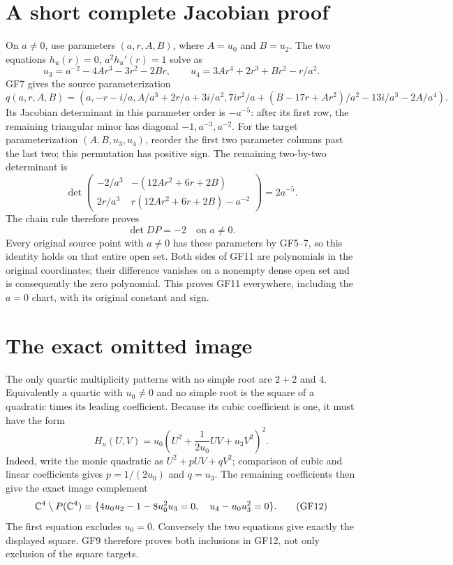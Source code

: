 \section{A short complete Jacobian proof}
On $a\ne0$, use parameters $(a,r,A,B)$, where $A=u_0$ and $B=u_2$.
The two equations $h_u(r)=0$, $a^2h_u'(r)=1$ solve as
\begin{equation}
 u_3=a^{-2}-4Ar^3-3r^2-2Br,
 \qquad u_4=3Ar^4+2r^3+Br^2-r/a^2.\tag{GF10}
\end{equation}
GF7 gives the source parameterization
\[
 q(a,r,A,B)=\left(a,-r-i/a,A/a^3+2r/a+3i/a^2,
 7ir^2/a+(B-17r+Ar^2)/a^2-13i/a^3-2A/a^4\right).
\]
Its Jacobian determinant in this parameter order is $-a^{-5}$:
after its first row, the remaining triangular minor has diagonal
$-1,a^{-3},a^{-2}$. For the target parameterization
$(A,B,u_3,u_4)$, reorder the first two parameter columns past the
last two; this permutation has positive sign. The remaining
two-by-two determinant is
\[
 \det\begin{pmatrix}
 -2/a^3&-(12Ar^2+6r+2B)\\
 2r/a^3&r(12Ar^2+6r+2B)-a^{-2}
 \end{pmatrix}=2a^{-5}.
\]
The chain rule therefore proves
\begin{equation}
 \det DP=-2\quad\text{on }a\ne0.\tag{GF11}
\end{equation}
Every original source point with $a\ne0$ has these parameters by
GF5--7, so this identity holds on that entire open set. Both sides
of GF11 are polynomials in the original coordinates; their
difference vanishes on a nonempty dense open set and is consequently
the zero polynomial. This proves GF11 everywhere, including the
$a=0$ chart, with its original constant and sign.

\section{The exact omitted image}
The only quartic multiplicity patterns with no simple root are
$2+2$ and $4$. Equivalently a quartic with $u_0\ne0$ and no simple
root is the square of a quadratic times its leading coefficient.
Because its cubic coefficient is one, it must have the form
\[
 H_u(U,V)=u_0\left(U^2+\frac{1}{2u_0}UV+u_3V^2\right)^2.
\]
Indeed, write the monic quadratic as $U^2+pUV+qV^2$; comparison
of cubic and linear coefficients gives $p=1/(2u_0)$ and $q=u_3$.
The remaining coefficients then give the exact image complement
\begin{equation}
 \mathbb C^4\setminus P(\mathbb C^4)
 =\{4u_0u_2-1-8u_0^2u_3=0,\quad u_4-u_0u_3^2=0\}.
 \tag{GF12}
\end{equation}
The first equation excludes $u_0=0$. Conversely the two equations
give exactly the displayed square. GF9 therefore proves both
inclusions in GF12, not only exclusion of the square targets.

